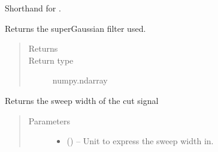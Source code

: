 \documentclass[letterpaper,10pt,english]{sphinxmanual}
\begin{document}
\begin{fulllineitems}

\begin{fulllineitems}
\label{\detokenize{references/freqfilter:nmrespy.freqfilter.FrequencyFilter.get_sg}}
\sphinxAtStartPar
Shorthand for {\hyperref[\detokenize{references/freqfilter:nmrespy.freqfilter.FrequencyFilter.get_super_gaussian}]{}}.

\end{fulllineitems}


\begin{fulllineitems}
\label{\detokenize{references/freqfilter:nmrespy.freqfilter.FrequencyFilter.get_super_gaussian}}
\sphinxAtStartPar
Returns the super\sphinxhyphen{}Gaussian filter used.
\begin{quote}\begin{description}
\item[{Returns}] \leavevmode
\sphinxAtStartPar
{}

\item[{Return type}] \leavevmode
\sphinxAtStartPar
numpy.ndarray

\end{description}\end{quote}

\end{fulllineitems}


\begin{fulllineitems}
\label{\detokenize{references/freqfilter:nmrespy.freqfilter.FrequencyFilter.get_sw}}
\sphinxAtStartPar
Returns the sweep width of the cut signal
\begin{quote}\begin{description}
\item[{Parameters}] \leavevmode\begin{itemize}
\item {} 
\sphinxAtStartPar
{} (\sphinxstyleliteralemphasis{\sphinxupquote{, }}\sphinxstyleliteralemphasis{\sphinxupquote{, }}) – Unit to express the sweep width in.


\end{itemize}
\end{description}
\end{quote}
\end{fulllineitems}
\end{fulllineitems}
\end{document}
